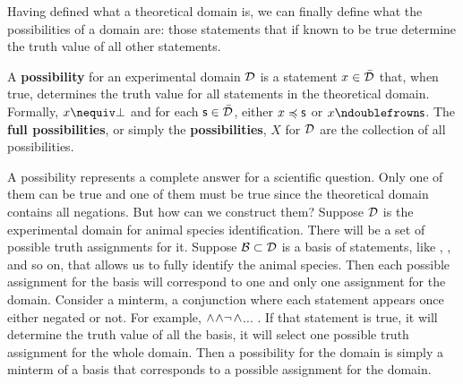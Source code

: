 	Having defined what a theoretical domain is, we can finally define what the possibilities of a domain are: those statements that if known to be true determine the truth value of all other statements.
	
	\begin{mathSection}
		
		\begin{defn}\label{pm-vs-defPossibilities}
			A \textbf{possibility} for an experimental domain $\mathcal{D}$ is a statement $x \in \bar{\mathcal{D}}$ that, when true, determines the truth value for all statements in the theoretical domain. Formally, $x \nequiv \impossibility$ and for each $\mathsf{s} \in \bar{\mathcal{D}}$, either $x \preccurlyeq \mathsf{s}$ or $x \ncomp \mathsf{s}$. The \textbf{full possibilities}, or simply the \textbf{possibilities}, $X$ for $\mathcal{D}$ are the collection of all possibilities.
		\end{defn}
		
	\end{mathSection}
	
	A possibility represents a complete answer for a scientific question. Only one of them can be true and one of them must be true since the theoretical domain contains all negations. But how can we construct them? Suppose $\mathcal{D}$ is the experimental domain for animal species identification. There will be a set of possible truth assignments for it. Suppose $\mathcal{B} \subset \mathcal{D}$ is a basis of statements, like , ,  and so on, that allows us to fully identify the animal species. Then each possible assignment for the basis will correspond to one and only one assignment for the domain. Consider a minterm, a conjunction where each statement appears once either negated or not. For example, $\wedge$$\wedge\neg$$\wedge$... . If that statement is true, it will determine the truth value of all the basis, it will select one possible truth assignment for the whole domain. Then a possibility for the domain is simply a minterm of a basis that corresponds to a possible assignment for the domain.
	
